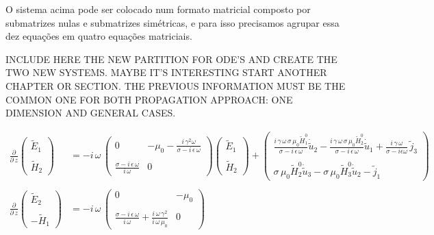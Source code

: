 O sistema acima pode ser colocado num formato matricial composto por submatrizes nulas e submatrizes sim\'etricas, e para isso precisamos agrupar essa dez equa\c{c}\~oes em quatro equa\c{c}\~oes matriciais.

INCLUDE HERE THE NEW PARTITION FOR  ODE'S AND CREATE THE TWO NEW SYSTEMS. MAYBE IT'S INTERESTING START ANOTHER CHAPTER OR SECTION. THE PREVIOUS INFORMATION MUST BE THE COMMON ONE FOR BOTH PROPAGATION APPROACH: ONE DIMENSION AND GENERAL CASES.  

\begin{align}\label{eq.matricial_1}
\frac{\partial}{\partial\,z}
\begin{pmatrix}
\tilde{E}_1\\\\
\tilde{H}_2
\end{pmatrix}
&=-i\,\omega\,
\begin{pmatrix}
0&-\mu_0-\frac{i\,\gamma^2\omega}{\sigma-i\,\epsilon\,\omega}\\\\
\frac{\sigma-i\,\epsilon\,\omega}{i\,\omega}&0
\end{pmatrix}
\begin{pmatrix}
\tilde{E}_1\\\\
\tilde{H}_2
\end{pmatrix}
+
\begin{pmatrix}
\frac{i\,\gamma\,\omega\,\sigma\,\mu_0\tilde{H}_1^0}{\sigma-i\,\epsilon\,\omega}\dot{\tilde{u}}_2-\frac{i\,\gamma\,\omega\,\sigma\,\mu_0\tilde{H}_2^0}{\sigma-i\,\epsilon\,\omega}\dot{\tilde{u}}_1+\frac{i\,\gamma\,\omega}{\sigma-i\epsilon\omega}\,\tilde{j}_3\\\\
\sigma\,\mu_0\tilde{H}_2^0\dot{\tilde{u}}_3-\sigma\,\mu_0\tilde{H}_3^0\dot{\tilde{u}}_2-\tilde{j}_1
\end{pmatrix}\\\nonumber\\\label{eq.matricial_2}
\frac{\partial}{\partial\,z}
\begin{pmatrix}
\tilde{E}_2\\\\
-\tilde{H}_1
\end{pmatrix}
&=-i\,\omega\,
\begin{pmatrix}
0&-\mu_0\\\\
\frac{\sigma-i\,\epsilon\,\omega}{i\,\omega}+\frac{i\,\omega\,\gamma^2}{i\,\omega\,\mu_0}&0
\end{pmatrix}

\end{align}

